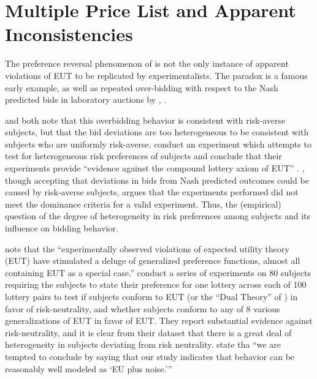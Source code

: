 \documentclass[../main.tex]{subfiles}
\begin{document}
\section{\texorpdfstring{\textcite{Holt2002}}{Holt \& Laury (2002)} Multiple Price List and Apparent Inconsistencies}

The preference reversal phenomenon of \textcite{Grether1979} is not the only instance of apparent violations of EUT to be replicated by experimentalists.
The \textcite{Ellsberg1961} paradox is a famous early example, as well as repeated over-bidding with respect to the Nash predicted bids in laboratory auctions by \textcite{Cox1982}, \textcite{Cox1983, Cox1983a, Cox1988}.


\textcite[160]{Cox1985} and \textcite[749]{Harrison1989} both note that this overbidding behavior is consistent with risk-averse subjects, but that the bid deviations are too heterogeneous to be consistent with subjects who are uniformly risk-averse.
\textcite{Cox1985} conduct an experiment which attempts to test for heterogeneous risk preferences of subjects and conclude that their experiments provide \enquote{evidence against the compound lottery axiom of EUT} \parencite[165]{Cox1985}.
\textcite{Harrison1989}, though accepting that deviations in bids from Nash predicted outcomes could be caused by risk-averse subjects, argues that the experiments performed did not meet the dominance criteria for a valid experiment.
Thus, the (empirical) question of the degree of heterogeneity in risk preferences among subjects and its influence on bidding behavior.


\textcite[1291]{Hey1994} note that the \enquote{experimentally observed violations of expected utility theory (EUT) have stimulated a deluge of generalized preference functions, almost all containing  EUT as a special case.}
\textcite{Hey1994} conduct a series of experiments on 80 subjects requiring the subjects to state their preference for one lottery across each of 100 lottery pairs to test if subjects conform to EUT (or the \enquote{Dual Theory} of \textcite{Yaari1987}) in favor of risk-neutrality, and whether subjects conform to any of 8 various generalizations of EUT in favor of EUT.
They report substantial evidence against risk-neutrality, and it is clear from their dataset that there is a great deal of heterogeneity in subjects deviating from risk neutrality.
\textcite[1322]{Hey1994} state tha \enquote{we are tempted to conclude by saying that our study indicates that behavior can be reasonably well modeled \textelp{} as \enquote{EU plus noise.}} 
\end{document}
